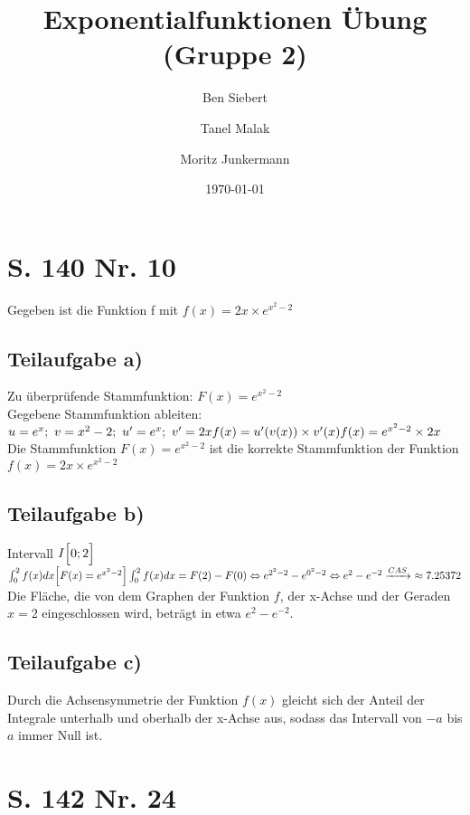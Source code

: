 \documentclass[11pt, a4paper]{report}
\begin{document}
	\title{Exponentialfunktionen Übung (Gruppe 2)}
	\author{Ben Siebert \and Tanel Malak \and Moritz Junkermann}
	\date{\today}
	\maketitle
	\tableofcontents
	\bsremovechaptertitle
	\chapter{S. 140 Nr. 10}
	Gegeben ist die Funktion f mit $f(x) = 2x \times e^{x^2-2}$
	\section{Teilaufgabe a)}
	Zu überprüfende Stammfunktion: $F(x) = e^{x^2-2}$ \\
	Gegebene Stammfunktion ableiten: \\
	$u = e^x;\ v = x^2 - 2;\ u' = e^x;\ v' = 2x\\
	f(x) = u'(v(x)) \times v'(x) \\
	f(x) = e^{x^2 - 2} \times 2x \\
	$
	Die Stammfunktion $F(x) = e^{x^2-2}$ ist die korrekte Stammfunktion der Funktion $f(x) = 2x \times e^{x^2-2}$
	\section{Teilaufgabe b)}
	Intervall $I\Bigl[0;2\Bigl]$ \\
	$
	\int_{0}^{2}f(x) dx \Bigl[F(x) = e^{x^2-2}\Bigl]\\
	\int_{0}^{2}f(x) dx = F(2) - F(0) \\
	\Leftrightarrow e^{2^2-2} - e^{0^2-2} \\
	\Leftrightarrow e^{2} - e^{-2} \\
	\xrightarrow[]{CAS}\ \approx 7.25372 \\
	$
	Die Fläche, die von dem Graphen der Funktion $f$, der x-Achse und der Geraden $x=2$ eingeschlossen wird, beträgt in etwa $e^2 - e^{-2}$.
	\section{Teilaufgabe c)}
	Durch die Achsensymmetrie der Funktion $f(x)$ gleicht sich der Anteil der Integrale unterhalb und oberhalb der x-Achse aus, sodass das Intervall von $-a$ bis $a$ immer Null ist.
	\chapter{S. 142 Nr. 24}
\end{document}
